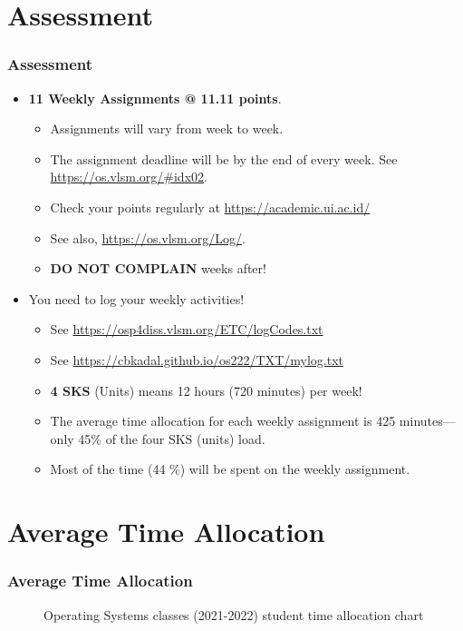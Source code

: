 \documentclass[aspectratio=169, xcolor=table, notheorems, hyperref={pdfpagelabels=false}]{beamer}
\begin{document}
\section{Assessment}
\begin{frame}
\frametitle{Assessment}
\begin{itemize}
\item \textbf{11 Weekly Assignments @ 11.11 points}.
\begin{itemize}
\item Assignments will vary from week to week.
\item The assignment deadline will be by the end of every week. 
See \url{https://os.vlsm.org/\#idx02}.
\item Check your points regularly at \url{https://academic.ui.ac.id/}
\item See also, \url{https://os.vlsm.org/Log/}.
\item \textbf{DO NOT COMPLAIN} weeks after! 
\end{itemize}
\item You need to log your weekly activities!
\begin{itemize}
\item See \url{https://osp4diss.vlsm.org/ETC/logCodes.txt}
\item See \url{https://cbkadal.github.io/os222/TXT/mylog.txt}
\item \textbf{4 SKS} (Units) means 12 hours (720 minutes) per week!
\item The average time allocation for each weekly assignment is 
      425 minutes—only 45\% of the four SKS (units) load.
\item Most of the time (44 \%) will be spent on the weekly assignment.
\end{itemize}
\end{itemize}

\end{frame}

\section{Average Time Allocation}
\begin{frame}
\frametitle{Average Time Allocation}

\begin{figure}
\caption{Operating Systems classes (2021-2022) student time allocation chart}
\end{figure}

\end{frame}
\end{document}

